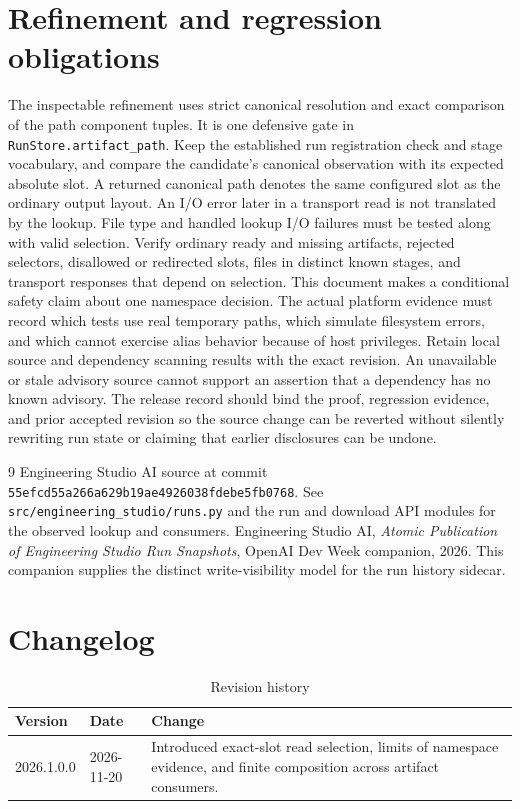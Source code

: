\documentclass[12pt]{article}
\begin{document}
\section{Refinement and regression obligations}
\label{sec:refinement}
The inspectable refinement uses strict canonical resolution and exact comparison of the path component tuples. It is one defensive gate in
\texttt{RunStore.artifact\_path}. Keep the established run registration
check and stage vocabulary, and compare the candidate's canonical
observation with its expected absolute slot. A returned canonical
path denotes the same configured slot as the ordinary output layout.
An I/O error later in a transport read is not translated by the lookup. File type and handled lookup I/O failures must be tested along with valid
selection. Verify ordinary ready and missing artifacts, rejected
selectors, disallowed or redirected slots, files in distinct
known stages, and transport responses that depend on selection.
This document makes a conditional safety claim about one namespace
decision. The actual platform evidence must record which tests use
real temporary paths, which simulate filesystem errors, and which
cannot exercise alias behavior because of host privileges. Retain
local source and dependency scanning results with the exact revision.
An unavailable or stale advisory source cannot support an assertion
that a dependency has no known advisory. The release record should
bind the proof, regression evidence, and prior accepted revision so
the source change can be reverted without silently rewriting run
state or claiming that earlier disclosures can be undone.

\begin{thebibliography}{9}
Engineering Studio AI source at commit
\nolinkurl{55efcd55a266a629b19ae4926038fdebe5fb0768}.
See \texttt{src/engineering\_studio/runs.py} and the run and
download API modules for the observed lookup and consumers.
Engineering Studio AI, \textit{Atomic Publication of Engineering
Studio Run Snapshots}, OpenAI Dev Week companion, 2026.
This companion supplies the distinct write-visibility model for
the run history sidecar.
\end{thebibliography}

\clearpage
\section*{Changelog}
\begin{table}[!htbp]
\centering\small
\caption{Revision history}
\begin{tabularx}{\linewidth}{@{}llX@{}}
\toprule
Version & Date & Change \\
\midrule
2026.1.0.0 & 2026-11-20 & Introduced exact-slot read selection, limits
of namespace evidence, and finite composition across artifact consumers. \\
\bottomrule
\end{tabularx}
\end{table}
\end{document}
